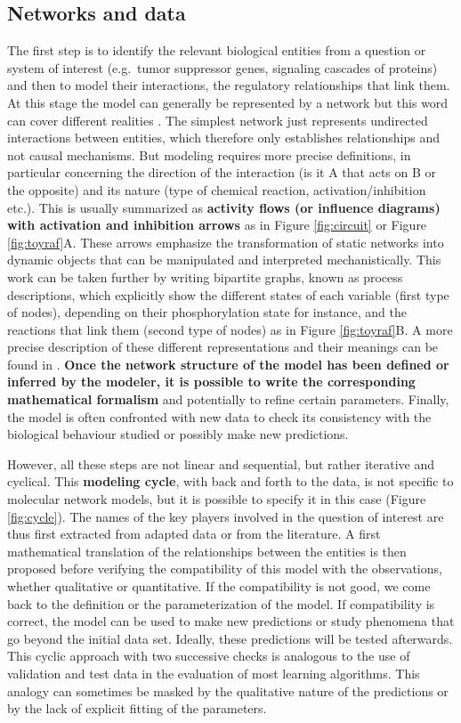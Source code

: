 \documentclass[a4paper,12pt,twoside,onecolumn,openright,final,oldfontcommands]{memoir}
\begin{document}
\subsection{Networks and data}\label{networks-and-data}

The first step is to identify the relevant biological entities from a
question or system of interest (e.g.~tumor suppressor genes, signaling
cascades of proteins) and then to model their interactions, the
regulatory relationships that link them. At this stage the model can
generally be represented by a network but this word can cover different
realities \citep{le2015quantitative}. The simplest network just
represents undirected interactions between entities, which therefore
only establishes relationships and not causal mechanisms. But modeling
requires more precise definitions, in particular concerning the
direction of the interaction (is it A that acts on B or the opposite)
and its nature (type of chemical reaction, activation/inhibition etc.).
This is usually summarized as \textbf{activity flows (or influence
diagrams) with activation and inhibition arrows} as in Figure
\ref{fig:circuit} or Figure \ref{fig:toyraf}A. These arrows emphasize
the transformation of static networks into dynamic objects that can be
manipulated and interpreted mechanistically. This work can be taken
further by writing bipartite graphs, known as process descriptions,
which explicitly show the different states of each variable (first type
of nodes), depending on their phosphorylation state for instance, and
the reactions that link them (second type of nodes) as in Figure
\ref{fig:toyraf}B. A more precise description of these different
representations and their meanings can be found in
\citet{le2015quantitative}. \textbf{Once the network structure of the
model has been defined or inferred by the modeler, it is possible to
write the corresponding mathematical formalism} and potentially to
refine certain parameters. Finally, the model is often confronted with
new data to check its consistency with the biological behaviour studied
or possibly make new predictions.

However, all these steps are not linear and sequential, but rather
iterative and cyclical. This \textbf{modeling cycle}, with back and
forth to the data, is not specific to molecular network models, but it
is possible to specify it in this case (Figure \ref{fig:cycle}). The
names of the key players involved in the question of interest are thus
first extracted from adapted data or from the literature. A first
mathematical translation of the relationships between the entities is
then proposed before verifying the compatibility of this model with the
observations, whether qualitative or quantitative. If the compatibility
is not good, we come back to the definition or the parameterization of
the model. If compatibility is correct, the model can be used to make
new predictions or study phenomena that go beyond the initial data set.
Ideally, these predictions will be tested afterwards. This cyclic
approach with two successive checks is analogous to the use of
validation and test data in the evaluation of most learning algorithms.
This analogy can sometimes be masked by the qualitative nature of the
predictions or by the lack of explicit fitting of the parameters.
\end{document}
